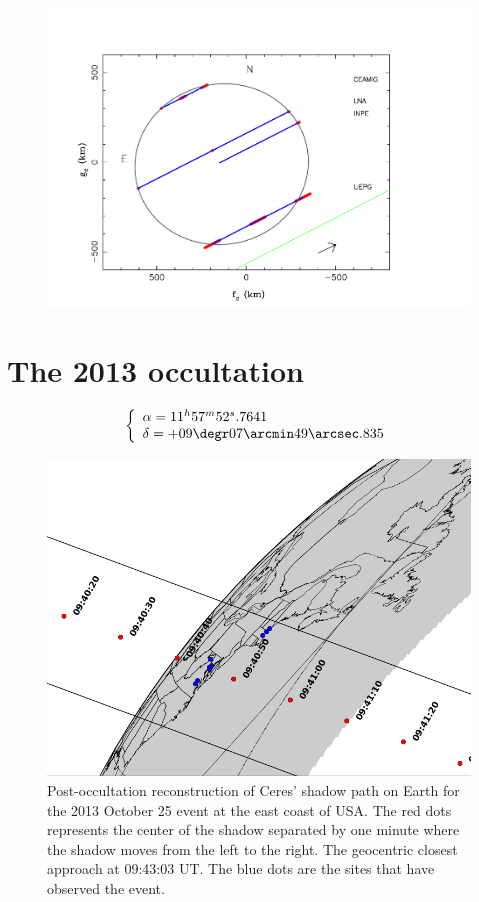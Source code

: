 \documentclass[useAMS,usenatbib]{mn2e}
\begin{document}
\begin{figure}
\includegraphics[scale=0.36]{figures/Ceres_2010_body.pdf} 
\caption{\label{Fig:Ceres-2010-body}}
\end{figure}

\section[]{The 2013 occultation}

\begin{equation}
\left\{ 
  \begin{array}{l l}
    \alpha = 11^{h}57^{m}52^{s}.7641\\
    \delta = +09\degr 07\arcmin 49\arcsec.835
  \end{array}
\right.
\end{equation}

\begin{figure}
\includegraphics[scale=0.42]{figures/Ceres_2013.png} 
\caption{Post-occultation reconstruction of Ceres' shadow path on Earth for the 2013 October 25 event at the east coast of USA. The red dots represents the center of the shadow separated by one minute where the shadow moves from the left to the right. The geocentric closest approach at 09:43:03 UT. The blue dots are the sites that have observed the event.\label{Fig: Ceres-2013-map}}
\end{figure}
\end{document}
